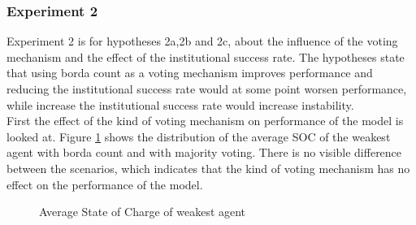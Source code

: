\documentclass[a4paper]{article}
\begin{document}
\subsubsection{Experiment 2}
Experiment 2 is for hypotheses 2a,2b and 2c, about the influence of the voting mechanism and the effect of the institutional success 
rate. The hypotheses state that using borda count as a voting mechanism improves performance and reducing the institutional success 
rate would at some point worsen performance, while increase the institutional success rate would increase instability.\\
First the effect of the kind of voting mechanism on performance of the model is looked at.
Figure \ref{b_average} shows the distribution of the average SOC of the weakest agent with borda count and with majority 
voting. There is no visible difference between the scenarios, which indicates that the kind of voting mechanism has no 
effect on the performance of the model. \\ 
\begin{figure}[!ht]
\caption{Average State of Charge of weakest agent}
\label{b_average}
\end{figure}\\
\end{document}
